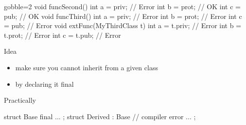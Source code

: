 \begin{frame}[fragile]
  \begin{multicols}{2}
    \columnbreak
    \begin{cppcode*}{gobble=2}
      void funcSecond() {
        int a = priv;   // Error
        int b = prot;   // OK
        int c = pub;    // OK
      }
      void funcThird() {
        int a = priv;   // Error
        int b = prot;   // Error
        int c = pub;    // Error
      }
      void extFunc(MyThirdClass t) {
        int a = t.priv; // Error
        int b = t.prot; // Error
        int c = t.pub;  // Error
      }
    \end{cppcode*}
  \end{multicols}
\end{frame}

\begin{advanced}
\begin{frame}[fragile]
  \begin{block}{Idea}
    \begin{itemize}
    \item make sure you cannot inherit from a given class
    \item by declaring it final
    \end{itemize}
  \end{block}
  \begin{exampleblock}{Practically}
    \begin{cppcode}
      struct Base final {
        ...
      };
      struct Derived : Base { // compiler error
        ...
      };
    \end{cppcode}
  \end{exampleblock}
\end{frame}
\end{advanced}

